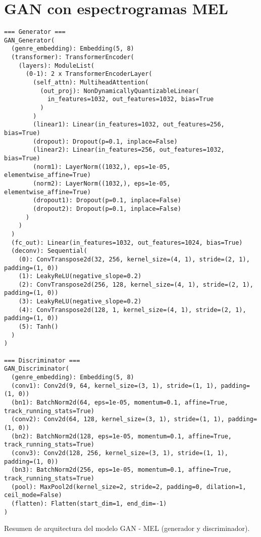 \section{GAN con espectrogramas MEL}

\begin{table}[H]
\centering
\begin{minipage}{0.95\textwidth}
\begin{lstlisting}[basicstyle=\scriptsize\ttfamily]
=== Generator ===
GAN_Generator(
  (genre_embedding): Embedding(5, 8)
  (transformer): TransformerEncoder(
    (layers): ModuleList(
      (0-1): 2 x TransformerEncoderLayer(
        (self_attn): MultiheadAttention(
          (out_proj): NonDynamicallyQuantizableLinear(
            in_features=1032, out_features=1032, bias=True
          )
        )
        (linear1): Linear(in_features=1032, out_features=256, bias=True)
        (dropout): Dropout(p=0.1, inplace=False)
        (linear2): Linear(in_features=256, out_features=1032, bias=True)
        (norm1): LayerNorm((1032,), eps=1e-05, elementwise_affine=True)
        (norm2): LayerNorm((1032,), eps=1e-05, elementwise_affine=True)
        (dropout1): Dropout(p=0.1, inplace=False)
        (dropout2): Dropout(p=0.1, inplace=False)
      )
    )
  )
  (fc_out): Linear(in_features=1032, out_features=1024, bias=True)
  (deconv): Sequential(
    (0): ConvTranspose2d(32, 256, kernel_size=(4, 1), stride=(2, 1), padding=(1, 0))
    (1): LeakyReLU(negative_slope=0.2)
    (2): ConvTranspose2d(256, 128, kernel_size=(4, 1), stride=(2, 1), padding=(1, 0))
    (3): LeakyReLU(negative_slope=0.2)
    (4): ConvTranspose2d(128, 1, kernel_size=(4, 1), stride=(2, 1), padding=(1, 0))
    (5): Tanh()
  )
)

=== Discriminator ===
GAN_Discriminator(
  (genre_embedding): Embedding(5, 8)
  (conv1): Conv2d(9, 64, kernel_size=(3, 1), stride=(1, 1), padding=(1, 0))
  (bn1): BatchNorm2d(64, eps=1e-05, momentum=0.1, affine=True, track_running_stats=True)
  (conv2): Conv2d(64, 128, kernel_size=(3, 1), stride=(1, 1), padding=(1, 0))
  (bn2): BatchNorm2d(128, eps=1e-05, momentum=0.1, affine=True, track_running_stats=True)
  (conv3): Conv2d(128, 256, kernel_size=(3, 1), stride=(1, 1), padding=(1, 0))
  (bn3): BatchNorm2d(256, eps=1e-05, momentum=0.1, affine=True, track_running_stats=True)
  (pool): MaxPool2d(kernel_size=2, stride=2, padding=0, dilation=1, ceil_mode=False)
  (flatten): Flatten(start_dim=1, end_dim=-1)
)

\end{lstlisting}
\end{minipage}
\caption{Resumen de arquitectura del modelo GAN - MEL (generador y discriminador).}
\label{tab:gan_mel_model_summary}
\end{table}

